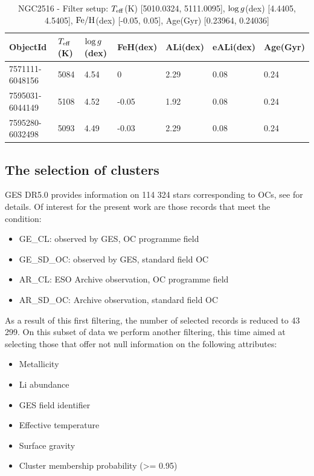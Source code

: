 \documentclass[fleqn,usenatbib]{mnras}
\begin{document}
\begin{table}
	\centering
	\begin{tabular}{l l l l l l l} 
		\hline
            ObjectId & $T_{\mathrm{eff}}$(K) & $\mathrm{log} \, g$(dex) & FeH(dex) & ALi(dex) & eALi(dex) & Age(Gyr)\\
		\hline
            7571111-6048156 & 5084 & 4.54 & 0 & 2.29 & 0.08 & 0.24\\ 
            7595031-6044149 & 5108 & 4.52 & -0.05 & 1.92 & 0.08 & 0.24\\ 
            7595280-6032498 & 5093 & 4.49 & -0.03 & 2.29 & 0.08 & 0.24\\ 
            \hline
	\end{tabular}
 	\caption{NGC2516 - Filter setup: $T_{\mathrm{eff}}$(K) [5010.0324, 5111.0095], $\mathrm{log} \, g$(dex) [4.4405, 4.5405], $\mathrm{Fe}/\mathrm{H}$(dex) [-0.05, 0.05], Age(Gyr) [0.23964, 0.24036]}
	\label{tab:oc_ngc2516}

\end{table}


\subsection{The selection of clusters}
GES DR5.0 provides information on 114 324 stars corresponding to OCs, see \cite{Gilmore2022} for details. Of interest for the present work are those records that meet the condition:
\begin{itemize}
    \item GE\_CL: observed by GES, OC programme field
    \item GE\_SD\_OC: observed by GES, standard field OC
    \item AR\_CL: ESO Archive observation, OC programme field
    \item AR\_SD\_OC: Archive observation, standard field OC
\end{itemize}

As a result of this first filtering, the number of selected records is reduced to 43 299. On this subset of data we perform another filtering, this time aimed at selecting those that offer not null information on the following attributes:
\begin{itemize}
    \item Metallicity
    \item Li abundance
    \item GES field identifier
    \item Effective temperature
    \item Surface gravity
    \item Cluster membership probability (>= 0.95)
\end{itemize}
\end{document}
